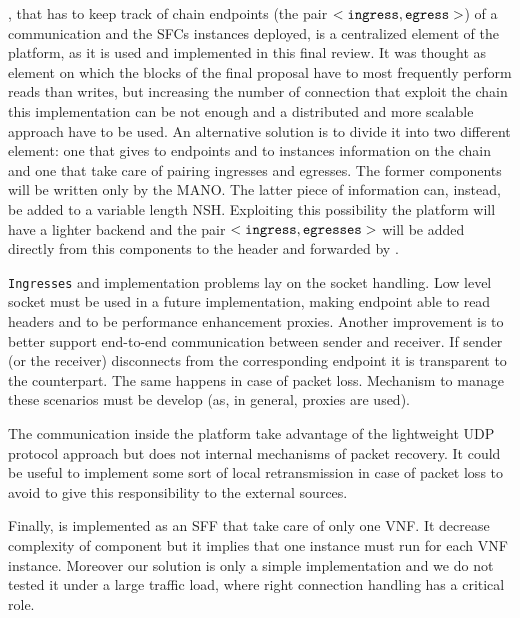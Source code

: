 \roulette{}, that has to keep track of chain endpoints (the pair $<\texttt{ingress}{},
\texttt{egress}{}>$) of a communication and the SFCs instances deployed, is a
centralized element of the platform, as it is used and implemented in this final
review. It was thought as element on which the blocks of the final proposal have
to most frequently perform reads than writes, but increasing the number of
connection that exploit the chain this implementation can be not enough and a
distributed and more scalable approach have to be used. An alternative solution
is to divide it into two different element: one that gives to endpoints and to 
\astaire{} instances information on the chain and one that take care of pairing
ingresses and egresses. The former components will be written only by the MANO.
The latter piece of information can, instead, be added to a variable length NSH.
Exploiting this possibility the platform will have a lighter backend and the
pair $<\texttt{ingress}{}, \texttt{egresses}{}>$ will be added directly from this components to
the header and forwarded by \astaire{}. 

\texttt{Ingresses} and \egresses{} implementation problems lay on the socket
handling. Low level socket must be used in a future implementation, making
endpoint able to read headers and to be performance enhancement proxies. Another
improvement is to better support end-to-end communication between sender and
receiver. If sender (or the receiver) disconnects from the corresponding
endpoint it is transparent to the counterpart. The same happens in case of
packet loss. Mechanism to manage these scenarios must be develop (as, in
general, proxies are used).

The communication inside the platform take advantage of the lightweight UDP
protocol approach but does not internal mechanisms of packet recovery. It could
be useful to implement some sort of local retransmission in case of packet loss
to avoid to give this responsibility to the external sources.

Finally, \astaire{} is implemented as an SFF that take care of only one VNF. It
decrease complexity of component but it implies that one \astaire{} instance
must run for each VNF instance. Moreover our solution is only a simple
implementation and we do not tested it under a large traffic load, where right
connection handling has a critical role.

